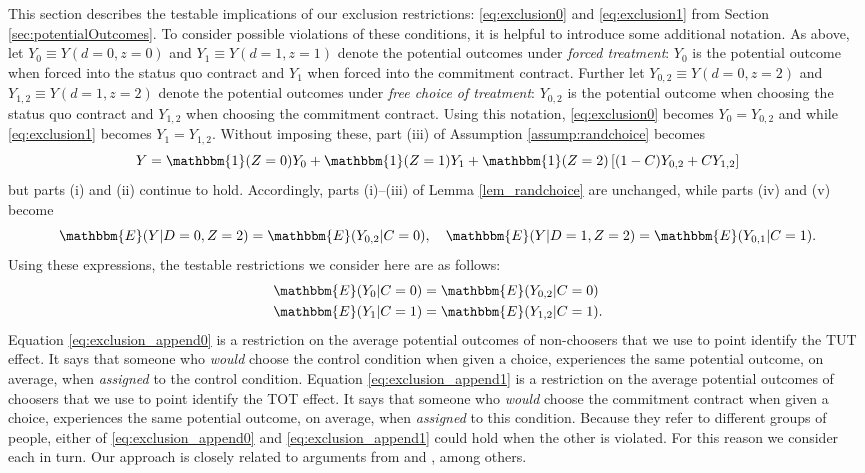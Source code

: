 This section describes the testable implications of our exclusion restrictions: \eqref{eq:exclusion0} and \eqref{eq:exclusion1} from Section \ref{sec:potentialOutcomes}. 
To consider possible violations of these conditions, it is helpful to introduce some additional notation.
As above, let $Y_0 \equiv Y(d=0,z=0)$ and $Y_1 \equiv Y(d=1,z=1)$ denote the potential outcomes under \emph{forced treatment}: $Y_0$ is the potential outcome when forced into the status quo contract and $Y_1$ when forced into the commitment contract. 
Further let $Y_{0,2} \equiv Y(d=0,z=2)$ and $Y_{1,2} \equiv Y(d=1,z=2)$ denote the potential outcomes under \emph{free choice of treatment}: $Y_{0,2}$ is the potential outcome when choosing the status quo contract and $Y_{1,2}$ when choosing the commitment contract. 
Using this notation, \eqref{eq:exclusion0} becomes $Y_0 = Y_{0,2}$ and while \eqref{eq:exclusion1} becomes $Y_1 = Y_{1,2}$.
Without imposing these, part (iii) of Assumption \ref{assump:randchoice} becomes 
\[
Y = \mathbbm{1}(Z =0) Y_{0} + \mathbbm{1}(Z = 1)  Y_{1}  + \mathbbm{1}(Z = 2) \left[(1 - C) Y_{0,2} + C Y_{1,2} \right]
\]
but parts (i) and (ii) continue to hold.
Accordingly, parts (i)--(iii) of Lemma \ref{lem_randchoice} are unchanged, while parts (iv) and (v) become
\[
\mathbbm{E}(Y|D=0,Z=2) = \mathbbm{E}(Y_{0,2}|C=0), \quad
\mathbbm{E}(Y|D=1,Z=2) = \mathbbm{E}(Y_{0,1}|C=1).
\]
Using these expressions, the testable restrictions we consider here are as follows:
\begin{align}
\label{eq:exclusion_append0}
\mathbbm{E}(Y_0|C=0) &= \mathbbm{E}(Y_{0,2}|C=0) \\
\label{eq:exclusion_append1}
\mathbbm{E}(Y_1|C=1) &= \mathbbm{E}(Y_{1,2}|C=1).
\end{align}
Equation \ref{eq:exclusion_append0} is a restriction on the average potential outcomes of non-choosers that we use to point identify the TUT effect.
It says that someone who \emph{would} choose the control condition when given a choice, experiences the same potential outcome, on average, when \emph{assigned} to the control condition.
Equation \ref{eq:exclusion_append1} is a restriction on the average potential outcomes of choosers that we use to point identify the TOT effect.
It says that someone who \emph{would} choose the commitment contract when given a choice, experiences the same potential outcome, on average, when \emph{assigned} to this condition.
Because they refer to different groups of people, either of \eqref{eq:exclusion_append0}  and \eqref{eq:exclusion_append1} could hold when the other is violated.
For this reason we consider each in turn.
Our approach is closely related to arguments from \cite{huber_mellace} and \cite{BinaryRegressor}, among others.

